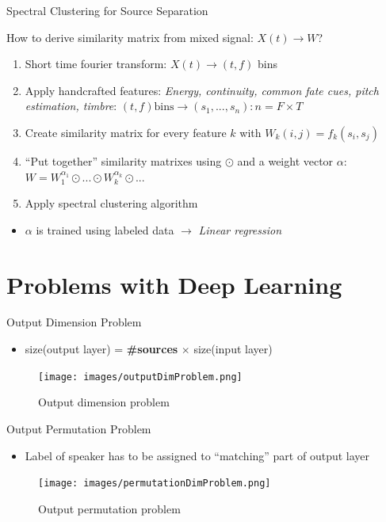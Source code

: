 \documentclass[xcolor=table,mathserif,9pt]{beamer}    %
\begin{document}
\begin{frame}{Spectral Clustering for Source Separation \cite{Bach:2006}}
	
How to derive similarity matrix from mixed signal: \emph{$X(t) \to W$}?
\vspace{10mm}
\begin{enumerate}
	\item Short time fourier transform: $X(t) \to (t,f)$ bins
	\item Apply handcrafted features: \emph{Energy, continuity, common fate cues, pitch estimation, timbre}: $(t,f) \text{bins} \to (s_1, ...,s_n): n = F \times T$
	\item Create similarity matrix for every feature $k$ with $W_k(i,j) = f_k(s_i,s_j)$
	\item ``Put together'' similarity matrixes using $\odot$ and a  weight vector $\alpha$: $W = W_1^{\alpha_1} \odot ... \odot W_k^{\alpha_k} \odot ...$ 
	\item Apply spectral clustering algorithm 
\end{enumerate}
\vspace{10mm}

\begin{itemize}
	\item $\alpha$ is trained using labeled data $\to$ \emph{Linear regression}
\end{itemize}


\end{frame}

\section{Problems with Deep Learning}%
\label{sec:problems_with_deep_learning}
\begin{frame}{Output Dimension Problem \cite{SingleChannelSourceSeparation}}

\begin{itemize}
	\item size(output layer) = \textbf{\#sources} $\times$ size(input layer)
\end{itemize}

\begin{figure}[htpb]
	\centering
	\texttt{[image: images/outputDimProblem.png]}
	\caption{Output dimension problem}
\end{figure}

\end{frame}

\begin{frame}{Output Permutation Problem \cite{SingleChannelSourceSeparation}}
	\begin{itemize}
		\item Label of speaker has to be assigned to ``matching'' part of output layer
	\end{itemize}

	\begin{figure}[htpb]
		\centering
		\texttt{[image: images/permutationDimProblem.png]}
		\caption{Output permutation problem}
	\end{figure}

\end{frame}
\end{document}
